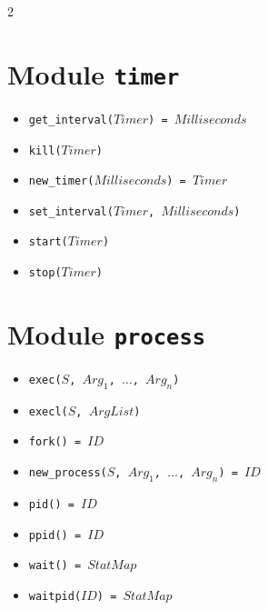 \documentclass[10pt]{article}
\begin{document}
\begin{multicols}{2}
{\section*{Module \texttt{timer}}
\begin{scriptsize}
\begin{itemize}
    \item \texttt{get\_interval($Timer$) = $Milliseconds$}
    \item \texttt{kill($Timer$)}
    \item \texttt{new\_timer($Milliseconds$) = $Timer$}
    \item \texttt{set\_interval($Timer$, $Milliseconds$)}
    \item \texttt{start($Timer$)}
    \item \texttt{stop($Timer$)}
\end{itemize}
\end{scriptsize}
\section*{Module \texttt{process}}
\begin{scriptsize}
\begin{itemize}
    \item \texttt{exec($S$, $Arg_1$, $\ldots$, $Arg_n$)}
    \item \texttt{execl($S$, $ArgList$)}
    \item \texttt{fork() = $ID$}
    \item \texttt{new\_process($S$, $Arg_1$, $\ldots$, $Arg_n$) = $ID$}
    \item \texttt{pid() = $ID$}
    \item \texttt{ppid() = $ID$}
    \item \texttt{wait() = $StatMap$}
    \item \texttt{waitpid($ID$) = $StatMap$}
\end{itemize}
\end{scriptsize}
}
\end{multicols}
\end{document}
